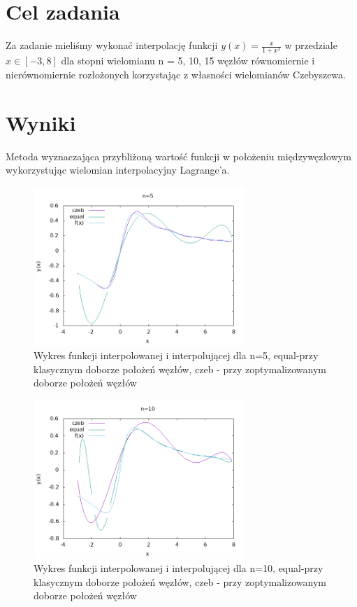 \documentclass{article}
\begin{document}
\section{Cel zadania}
Za zadanie mieliśmy wykonać interpolację funkcji $y(x)=\frac{x}{1+x^2}$ w przedziale $x\in [-3,8]$ dla stopni wielomianu n = 5, 10, 15 węzłów równomiernie i nierównomiernie rozłożonych korzystając z własności wielomianów Czebyszewa.

\section{Wyniki}
Metoda wyznaczająca
przybliżoną wartość funkcji w położeniu międzywęzłowym wykorzystując wielomian
interpolacyjny Lagrange’a.

\begin{figure}[h!]
\centering
\includegraphics[width=8cm]{5.png}
\caption{Wykres funkcji interpolowanej i interpolującej dla n=5,  equal-przy klasycznym doborze położeń węzłów, czeb - przy zoptymalizowanym doborze położeń
węzłów}
\label{fig:obrazek 5}
\end{figure}

\begin{figure}[h!]
\centering
\includegraphics[width=8cm]{10.png}
\caption{Wykres funkcji interpolowanej i interpolującej dla n=10,  equal-przy klasycznym doborze położeń węzłów, czeb - przy zoptymalizowanym doborze położeń
węzłów}
\label{fig:obrazek 10}
\end{figure}
\end{document}
